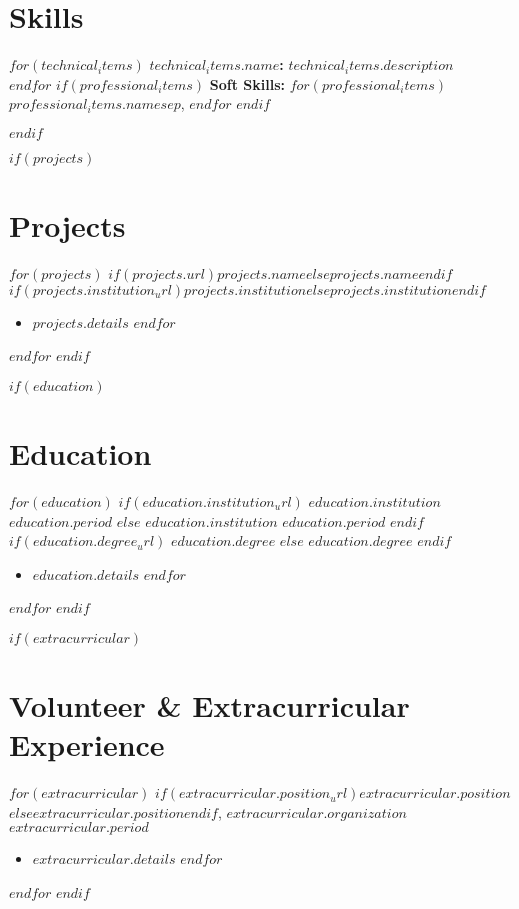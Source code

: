 \documentclass[10.5pt,a4paper]{article}
\newcommand{\daterange}[1]{\textbf{#1}}
\newcommand{\entryHeader}[2]{\noindent\textbf{#1} \hfill \daterange{#2}}
\newcommand{\entryHeaderLinked}[3]{\noindent\textbf{\href{#1}{#2}} \hfill \daterange{#3}}
\newcommand{\entrySubHeader}[1]{\textit{#1}}
\newcommand{\entrySubHeaderLinked}[2]{\textit{\href{#1}{#2}}}
\newenvironment{entryDetails}
  {%
    \begin{itemize}[leftmargin=2.5em, rightmargin=2.5em, itemsep=1pt, topsep=1pt, parsep=0pt]
  }
  {%
    \end{itemize}
    \vspace{-0.1cm}
  }
\begin{document}
\section*{Skills}
\begin{multicols}{2}
	\raggedcolumns
	$for(technical_items)$
	\noindent\textbf{$technical_items.name$:} $technical_items.description$\\[2pt]
	$endfor$
	$if(professional_items)$
	\noindent\textbf{Soft Skills:} $for(professional_items)$$professional_items.name$$sep$, $endfor$
	$endif$
\end{multicols}
$endif$

$if(projects)$
\section*{Projects}
$for(projects)$
\noindent\textbf{$if(projects.url)$\href{$projects.url$}{$projects.name$}$else$$projects.name$$endif$} \hfill \textbf{$if(projects.institution_url)$\href{$projects.institution_url$}{$projects.institution$}$else$\textit{$projects.institution$}$endif$}
\begin{entryDetails}
	$for(projects.details)$
	\item $projects.details$
	$endfor$
\end{entryDetails}
$endfor$
$endif$

$if(education)$
\section*{Education}
$for(education)$
$if(education.institution_url)$
\entryHeaderLinked{$education.institution_url$}{$education.institution$}{$education.period$}
$else$
\entryHeader{$education.institution$}{$education.period$}
$endif$
\\
$if(education.degree_url)$
\entrySubHeaderLinked{$education.degree_url$}{$education.degree$}
$else$
\entrySubHeader{$education.degree$}
$endif$
\begin{itemize}[leftmargin=1.5em, rightmargin=1em, itemsep=1pt, topsep=1pt, parsep=0pt]
	$for(education.details)$
	\item $education.details$
	      $endfor$
\end{itemize}
\vspace{-0.1cm}
$endfor$
$endif$

$if(extracurricular)$
\section*{Volunteer \& Extracurricular Experience}
$for(extracurricular)$
\noindent\textbf{$if(extracurricular.position_url)$\href{$extracurricular.position_url$}{$extracurricular.position$}$else$$extracurricular.position$$endif$}, $extracurricular.organization$ \hfill \daterange{$extracurricular.period$}
\begin{entryDetails}
	$for(extracurricular.details)$
	\item $extracurricular.details$
	$endfor$
\end{entryDetails}
$endfor$
$endif$
\end{document}
